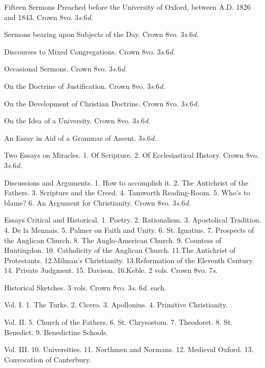 Fifteen Sermons Preached before the University of
Oxford, between A.D. 1826 and
1843. Crown 8vo. 3\emph{s.}\textbf{}6\emph{d}.

Sermons bearing upon Subjects of the Day. Crown
8vo. 3\emph{s.}\textbf{}6\emph{d.}

Discourses to Mixed Congregations. Crown 8vo. 3\emph{s.}\textbf{}6\emph{d.}

Occasional Sermons. Crown 8vo. 3\emph{s.}\textbf{}6\emph{d.}


On the Doctrine of Justification. Crown 8vo. 3\emph{s.}\textbf{}6\emph{d.}

On the Development of Christian Doctrine. Crown
8vo. 3\emph{s.}\textbf{}6\emph{d.}

On the Idea of a University. Crown 8vo. 3\emph{s.}\textbf{}6\emph{d.}

An Essay in Aid of a Grammar of Assent. 3\emph{s.}\textbf{}6\emph{d.}


Two Essays on Miracles. 1. Of Scripture. 2. Of
Ecclesiastical History. Crown 8vo. 3\emph{s.}\textbf{}6\emph{d.}

Discussions and Arguments. 1. How to accomplish it.
2. The Antichrist of the Fathers. 3. Scripture and the Creed. 4.
Tamworth Reading-Room. 5. Who's to blame? 6. An Argument for
Christianity. Crown 8vo. 3\emph{s.}\textbf{}6\emph{d.}

Essays Critical and Historical. 1. Poetry. 2. Rationalism. 3.
Apostolical Tradition. 4. De la Mennais. 5. Palmer on Faith and Unity.
6. St. Ignatius. 7. Prospects of the Anglican Church. 8. The
Anglo-American Church. 9. Countess of Huntingdon. 10. Catholicity of the
Anglican Church. 11.\textbf{}The
Antichrist of Protestants. 12.\textbf{}Milman's
Christianity. 13.\textbf{}Reformation of the Eleventh Century. 14. Private Judgment. 15.
Davison. 16.\textbf{}Keble. 2 vols. Crown 8vo. 7\emph{s}.


Historical Sketches. 3 vols. Crown 8vo. 3\emph{s}.
6\emph{d}. each.

Vol. I. 1. The Turks. 2. Cicero. 3. Apollonius. 4. Primitive
Christianity.

Vol. II. 5. Church of the Fathers. 6. St. Chrysostom. 7. Theodoret. 8.
St. Benedict. 9. Benedictine Schools.

Vol. III. 10. Universities. 11. Northmen and Normans. 12. Medieval
Oxford. 13. Convocation of Canterbury.

